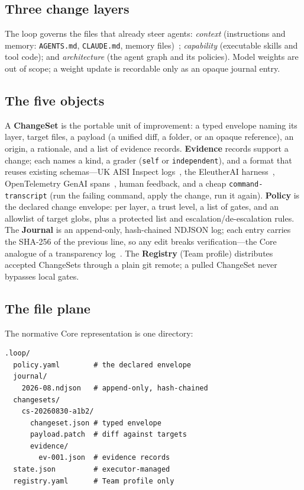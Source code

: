 \documentclass[10pt,twocolumn]{article}
\begin{document}
\subsection{Three change layers}
The loop governs the files that already steer agents:
\emph{context} (instructions and memory: \texttt{AGENTS.md},
\texttt{CLAUDE.md}, memory files)~\cite{agentsmd}; \emph{capability}
(executable skills and tool code); and \emph{architecture} (the agent
graph and its policies). Model weights are out of scope; a weight update
is recordable only as an opaque journal entry.

\subsection{The five objects}
A \textbf{ChangeSet} is the portable unit of improvement: a typed envelope
naming its layer, target files, a payload (a unified diff, a folder, or an
opaque reference), an origin, a rationale, and a list of evidence records.
\textbf{Evidence} records support a change; each names a kind, a grader
(\texttt{self} or \texttt{independent}), and a format that reuses existing
schemas---UK AISI Inspect logs~\cite{inspect}, the EleutherAI
harness~\cite{lmeval}, OpenTelemetry GenAI spans~\cite{otelgenai}, human
feedback, and a cheap \texttt{command-transcript} (run the failing command,
apply the change, run it again). \textbf{Policy} is the declared change
envelope: per layer, a trust level, a list of gates, and an allowlist of
target globs, plus a protected list and escalation/de-escalation rules.
The \textbf{Journal} is an append-only, hash-chained NDJSON log; each entry
carries the SHA-256 of the previous line, so any edit breaks
verification---the Core analogue of a transparency log~\cite{rfc6962}. The
\textbf{Registry} (Team profile) distributes accepted ChangeSets through a
plain git remote; a pulled ChangeSet never bypasses local gates.

\subsection{The file plane}
The normative Core representation is one directory:

\begin{verbatim}
.loop/
  policy.yaml        # the declared envelope
  journal/
    2026-08.ndjson   # append-only, hash-chained
  changesets/
    cs-20260830-a1b2/
      changeset.json # typed envelope
      payload.patch  # diff against targets
      evidence/
        ev-001.json  # evidence records
  state.json         # executor-managed
  registry.yaml      # Team profile only
\end{verbatim}
\end{document}
